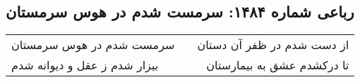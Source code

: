 \begin{center}
\section*{رباعی شماره ۱۴۸۴: سرمست شدم در هوس سرمستان}
\label{sec:1484}
\begin{longtable}{l p{0.5cm} r}
سرمست شدم در هوس سرمستان
&&
از دست شدم در ظفر آن دستان
\\
بیزار شدم ز عقل و دیوانه شدم
&&
تا درکشدم عشق به بیمارستان
\\
\end{longtable}
\end{center}
